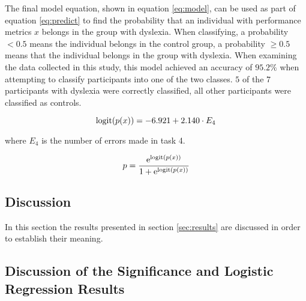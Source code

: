 \documentclass[journal]{IEEEtran}
\begin{document}
The final model equation, shown in equation \ref{eq:model}, can be used as part of equation \ref{eq:predict} to find the probability that an individual with performance metrics $x$ belongs in the group with dyslexia. When classifying, a probability $<0.5$ means the individual belongs in the control group, a probability $\geq 0.5$ means that the individual belongs in the group with dyslexia.
When examining the data collected in this study, this model achieved an accuracy of $95.2\%$ when attempting to classify participants into one of the two classes. $5$ of the $7$ participants with dyslexia were correctly classified, all other participants were classified as controls.

\begin{equation}
\small
\mathrm{logit}(p(x))= -6.921  + 2.140 \cdot E_{4} \label{eq:model}
\end{equation}
 \begin{center}
	\vspace*{-0.1cm}
	\small
   where $E_{4}$ is the number of errors made in task 4.
   \end{center}
   
   \begin{equation}
\small
p = \frac{\mathrm{e}^{\mathrm{logit}(p(x))}}{1 + \mathrm{e}^{\mathrm{logit}(p(x))}}
\label{eq:predict}
\end{equation}
   
\subsection{Discussion}
\label{sec:disscussion}
In this section the results presented in section \ref{sec:results} are discussed in order to establish their meaning.
 
\subsection{Discussion of the Significance and Logistic Regression Results}
\end{document}
